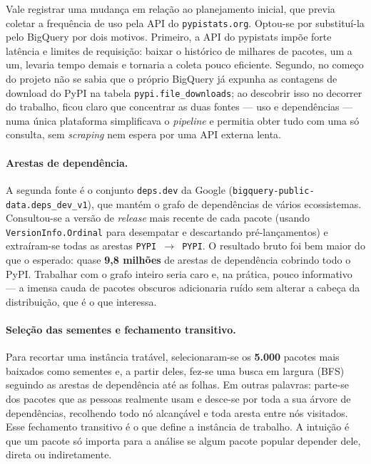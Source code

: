 \documentclass[11pt,a4paper]{article}
\begin{document}
Vale registrar uma mudança em relação ao planejamento inicial, que previa coletar a
frequência de uso pela API do \texttt{pypistats.org}. Optou-se por substituí-la pelo
BigQuery por dois motivos. Primeiro, a API do pypistats impõe forte latência e limites
de requisição: baixar o histórico de milhares de pacotes, um a um, levaria tempo
demais e tornaria a coleta pouco eficiente. Segundo, no começo do projeto não se
sabia que o próprio BigQuery já expunha as contagens de download do PyPI na tabela
\texttt{pypi.file\_downloads}; ao descobrir isso no decorrer do trabalho, ficou claro
que concentrar as duas fontes --- uso e dependências --- numa única plataforma
simplificava o \emph{pipeline} e permitia obter tudo com uma só consulta, sem
\emph{scraping} nem espera por uma API externa lenta.

\paragraph{Arestas de dependência.}
A segunda fonte é o conjunto \texttt{deps.dev} da Google
(\texttt{bigquery-public-data.deps\_dev\_v1}), que mantém o grafo de dependências de
vários ecossistemas. Consultou-se a versão de \emph{release} mais recente de cada
pacote (usando \texttt{VersionInfo.Ordinal} para desempatar e descartando
pré-lançamentos) e extraíram-se todas as arestas \texttt{PYPI $\to$ PYPI}. O resultado
bruto foi bem maior do que o esperado: quase \textbf{9,8 milhões} de arestas de
dependência cobrindo todo o PyPI. Trabalhar com o grafo inteiro seria caro e, na
prática, pouco informativo --- a imensa cauda de pacotes obscuros adicionaria ruído
sem alterar a cabeça da distribuição, que é o que interessa.

\paragraph{Seleção das sementes e fechamento transitivo.}
Para recortar uma instância tratável, selecionaram-se os \textbf{5.000} pacotes mais
baixados como sementes e, a partir deles, fez-se uma busca em largura (BFS)
seguindo as arestas de dependência até as folhas. Em outras palavras: parte-se dos
pacotes que as pessoas realmente usam e desce-se por toda a sua árvore de
dependências, recolhendo todo nó alcançável e toda aresta entre nós visitados.
Esse fechamento transitivo é o que define a instância de trabalho. A intuição é que
um pacote só importa para a análise se algum pacote popular depender dele,
direta ou indiretamente.
\end{document}
